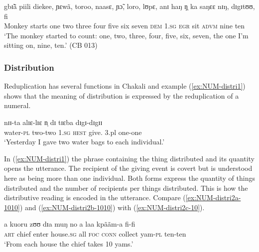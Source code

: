 \begin{exe}
\begin{exe}
\begin{exe}
{\begin{exe}
\begin{exe}
\begin{exe}
\begin{exe}
\begin{exe}
\begin{exe}
\begin{exe}
\begin{xlist}
\begin{exe}
\begin{exe}
\begin{exe}
\begin{exe}
\gll gbɪ̃ã piili diekee, ɲɛwã, toroo, naasɛ, ɲɔ̃, loro, lʊpɛ, anɪ haŋ
ŋ̩ ka saŋɛɛ nɪŋ, dɪgɪtʊʊ, fi\\
Monkey starts one two three four five six seven {\conn}  \textsc{dem}
\textsc{1.sg}
\textsc{egr} sit  \textsc{advm} nine ten\\

\glt `The monkey started to count: one, two, three, four, five, six, seven, the
one I'm sitting on, nine, ten.' (CB 013)
\end{exe}



\subsubsection{Distribution}
\label{sec:NUM-distri}

Reduplication has several functions in Chakali and example 
(\ref{ex:NUM-distri1}) shows that the meaning of
distribution is expressed by the reduplication of a numeral.

\begin{exe}
\ex\label{ex:NUM-distri1}
 \gll  nɪɪ-ta alɪɛ-lɪɛ  n̩  dɪ tɪɛba dɪgɪ-dɪgɪɪ\\
  {water-\textsc{pl}} {two-two}   \textsc{1.sg}   \textsc{hest}   {give.\sc
3.pl} {one-one}   \\
\glt  `Yesterday I gave two water bags to each individual.'\\
\end{exe}


In (\ref{ex:NUM-distri1}) the phrase containing the thing distributed and
its quantity opens the utterance. The recipient of the giving event is covert
but is
understood here as being more than one individual. Both  forms express the
quantity of things distributed and the number of recipients per things
distributed. This is how the distributive reading is
encoded in the utterance. Compare (\ref{ex:NUM-distri2a-1010}) and
(\ref{ex:NUM-distri2b-1010}) with
(\ref{ex:NUM-distri2c-10}).

 
\begin{exe}
\ex\label{ex:NUM-distri2-10}
\begin{xlist}
 
\ex\label{ex:NUM-distri2a-1010}{\it }
\gll a kuoru  zʊʊ dɪa  muŋ  no  a laa kpããm-a fi-fi \\
  \textsc{art}  {chief}  {enter}  {house.\textsc{sg}}   {all}  \textsc{foc} 
\textsc{conn}  {collect}  {yam-\textsc{pl}}  {ten-ten}      \\
\glt  `From each house the chief takes 10 yams.'


\end{xlist}
\end{exe}
\end{exe}
\end{exe}
\end{exe}
\end{xlist}
\end{exe}
\end{exe}
\end{exe}
\end{exe}
\end{exe}
\end{exe}
\end{exe}}
\end{exe}
\end{exe}
\end{exe}
